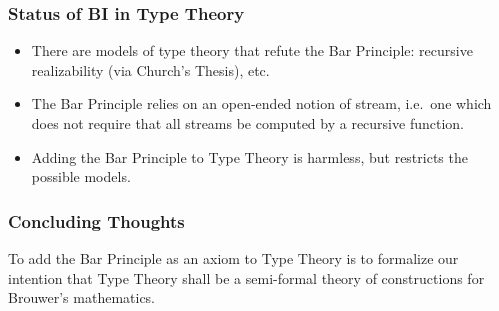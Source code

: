 \documentclass[10pt]{beamer}
\begin{document}
\begin{frame}
  \frametitle{Status of BI in Type Theory}
  \pause

  \begin{itemize}
    \item
      There are models of type theory that refute the Bar Principle:
      \alert{recursive realizability} (via Church's Thesis), etc.

      \pause
    \item
      The Bar Principle relies on an \alert{open-ended notion of stream}, i.e.\ one which does
      not require that all streams be computed by a recursive function.

      \pause
    \item
      Adding the Bar Principle to Type Theory is harmless, but \alert{restricts the
      possible models}.
\end{itemize}

\end{frame}

\begin{frame}
  \frametitle{Concluding Thoughts}

  To add the Bar Principle as an axiom to Type Theory is to formalize our intention that
  Type Theory shall be a semi-formal theory of constructions for Brouwer's mathematics.
\end{frame}

%
%
%   
%   
%
\end{document}
